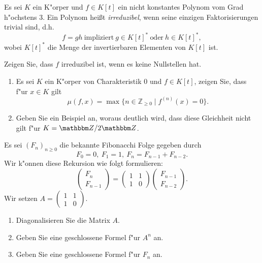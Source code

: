 \documentclass[a4,11pt]{article}
\begin{document}
\vspace*{-17mm}
{
\kopf
}


\begin{aufgabe}[4 Punkte]
Es sei $K$ ein K"orper und $f\in K[t]$ ein nicht konstantes Polynom vom Grad h"ochstens $3$. Ein Polynom heißt \emph{irreduzibel}, wenn seine einzigen Faktorisierungen trivial sind, d.h.
\[
f = gh \ \text{impliziert} \ g \in K[t]^* \ \text{oder} \ h\in K[t]^*,
\]
wobei $K[t]^*$ die Menge der invertierbaren Elementen von $K[t]$ ist.

Zeigen Sie, dass $f$ irreduzibel ist, wenn es keine Nullstellen hat.
\end{aufgabe}

\begin{aufgabe}[4 Punkte]
\begin{enumerate}
\item Es sei $K$ ein K"orper von Charakteristik $0$ und $f \in K[t]$, zeigen Sie, dass f"ur $x\in K$ gilt
\[
\mu(f,x) = \max \{ n \in \mathbb{Z}_{\geq 0} \mid  f^{(n)}(x) = 0 \}.
\]
\item Geben Sie ein Beispiel an, woraus deutlich wird, dass diese Gleichheit nicht gilt f"ur $K = \Z/2\Z$.
\end{enumerate}

\end{aufgabe}

\begin{aufgabe}[4 Punkte]
Es sei $(F_n)_{n\geq 0}$ die bekannte Fibonacchi Folge gegeben durch
\[
F_0 = 0, \ F_1 = 1, \  F_{n} = F_{n-1} + F_{n-2}.
\]
Wir k"onnen diese Rekursion wie folgt formulieren:
\[
\begin{pmatrix}F_{n} \\ F_{n-1}\end{pmatrix} =
\begin{pmatrix} 1 & 1\\ 1 & 0\end{pmatrix}
\begin{pmatrix}F_{n-1} \\ F_{n-2}\end{pmatrix}.
\]
Wir setzen $A = \begin{pmatrix} 1 & 1\\ 1 & 0\end{pmatrix}$.
  
\begin{enumerate}
\item Diagonalisieren Sie die Matrix $A$.
\item Geben Sie eine geschlossene Formel f"ur $A^n$ an.
\item Geben Sie eine geschlossene Formel f"ur $F_n$ an.
\end{enumerate}

\end{aufgabe}
\end{document}
